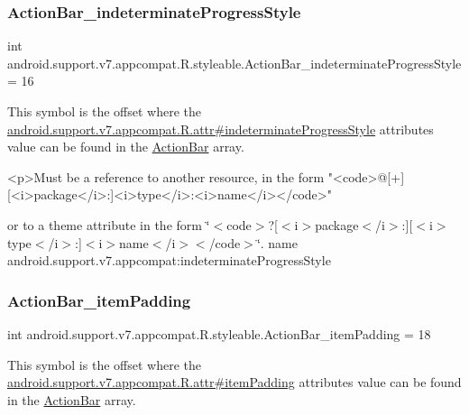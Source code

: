 \subsubsection{\texorpdfstring{Action\+Bar\+\_\+indeterminate\+Progress\+Style}{ActionBar\_indeterminateProgressStyle}}
{\footnotesize\ttfamily int android.\+support.\+v7.\+appcompat.\+R.\+styleable.\+Action\+Bar\+\_\+indeterminate\+Progress\+Style = 16\hspace{0.3cm}{\ttfamily [static]}}

This symbol is the offset where the \hyperlink{classandroid_1_1support_1_1v7_1_1appcompat_1_1R_1_1attr_adde2f2aab981417a891cc25b344b12a3}{android.\+support.\+v7.\+appcompat.\+R.\+attr\#indeterminate\+Progress\+Style} attribute\textquotesingle{}s value can be found in the \hyperlink{classandroid_1_1support_1_1v7_1_1appcompat_1_1R_1_1styleable_a5941dc15714398e9ec9afaa0155cc1cf}{Action\+Bar} array.

\begin{DoxyVerb}      <p>Must be a reference to another resource, in the form "<code>@[+][<i>package</i>:]<i>type</i>:<i>name</i></code>"
\end{DoxyVerb}
 or to a theme attribute in the form \char`\"{}$<$code$>$?\mbox{[}$<$i$>$package$<$/i$>$\+:\mbox{]}\mbox{[}$<$i$>$type$<$/i$>$\+:\mbox{]}$<$i$>$name$<$/i$>$$<$/code$>$\char`\"{}.  name android.\+support.\+v7.\+appcompat\+:indeterminate\+Progress\+Style \mbox{\label{classandroid_1_1support_1_1v7_1_1appcompat_1_1R_1_1styleable_af0906dce1243c89d098dc26008a19abc}} 
\subsubsection{\texorpdfstring{Action\+Bar\+\_\+item\+Padding}{ActionBar\_itemPadding}}
{\footnotesize\ttfamily int android.\+support.\+v7.\+appcompat.\+R.\+styleable.\+Action\+Bar\+\_\+item\+Padding = 18\hspace{0.3cm}{\ttfamily [static]}}

This symbol is the offset where the \hyperlink{classandroid_1_1support_1_1v7_1_1appcompat_1_1R_1_1attr_a9d344008ecd9d058d86d949b6b8ce639}{android.\+support.\+v7.\+appcompat.\+R.\+attr\#item\+Padding} attribute\textquotesingle{}s value can be found in the \hyperlink{classandroid_1_1support_1_1v7_1_1appcompat_1_1R_1_1styleable_a5941dc15714398e9ec9afaa0155cc1cf}{Action\+Bar} array.

